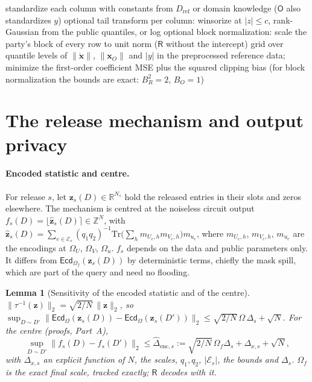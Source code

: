 \documentclass[11pt]{article}
\theoremstyle{definition}
\theoremstyle{plain}
\newtheorem{lemma}{Lemma}
\newcommand{\Rp}{\mathsf{R}}
\newcommand{\Op}{\mathsf{O}}
\newcommand{\Z}{\mathbb{Z}}
\newcommand{\Ecd}{\mathsf{Ecd}}
\newcommand{\bx}{\mathbf{x}}
\newcommand{\bxd}{\dot{\mathbf{x}}}
\begin{document}
\begin{algorithm}[h]
\begin{algorithmic}[1]
  \State standardize each column with constants from $D_{\mathrm{ref}}$ or domain knowledge ($\Op$ also standardizes $y$)
  \State optional tail transform per column: winsorize at $|z|\le c$, rank-Gaussian from the public quantiles, or log
  \State optional block normalization: scale the party's block of every row to unit norm ($\Rp$ without the intercept)
\EndFunction
{} grid over quantile levels of $\|\bxd\|$, $\|\bx_O\|$ and $|y|$ in the preprocessed reference data; minimize
\Statex \hspace{\algorithmicindent}the first-order coefficient MSE plus the squared clipping bias (for block normalization the bounds are exact: $B_R^2=2$, $B_O=1$)
\EndFunction
\end{algorithmic}
\end{algorithm}

\section{The release mechanism and output privacy}
\label{sec:privacy}

\paragraph{Encoded statistic and centre.} For release $s$, let $\mathbf z_s(D)\in\mathbb R^{N_s}$ hold the released entries in their slots and zeros elsewhere. The mechanism is centred at the noiseless circuit output $f_s(D)=\lfloor\hat{\mathbf z}_s(D)\rceil\in\Z^N$, with $\hat{\mathbf z}_s(D)=\sum_{e\in\mathcal E_s}(q_1q_2)^{-1}\mathrm{Tr}\bigl(\sum_hm_{U_e,h}m_{V_e,h}\bigr)m_{u_e}$, where $m_{U_e,h}$, $m_{V_e,h}$, $m_{u_e}$ are the encodings at $\Omega_U$, $\Omega_V$, $\Omega_u$. $f_s$ depends on the data and public parameters only. It differs from $\Ecd_{\Omega_f}(\mathbf z_s(D))$ by deterministic terms, chiefly the mask spill, which are part of the query and need no flooding.

\begin{lemma}[Sensitivity of the encoded statistic and of the centre]\label{lem:enc}
$\|\tau^{-1}(\mathbf z)\|_2=\sqrt{2/N}\,\|\mathbf z\|_2$, so $\sup_{D\sim D'}\|\Ecd_\Omega(\mathbf z_s(D))-\Ecd_\Omega(\mathbf z_s(D'))\|_2\le\sqrt{2/N}\,\Omega\,\Delta_s+\sqrt N$. For the centre (proofs, Part~A),
\[
  \sup_{D\sim D'}\|f_s(D)-f_s(D')\|_2\le\widehat\Delta_{\mathrm{enc},s}:=\sqrt{2/N}\,\Omega_f\Delta_s+\Delta_{x,s}+\sqrt N,
\]
with $\Delta_{x,s}$ an explicit function of $N$, the scales, $q_1,q_2$, $|\mathcal E_s|$, the bounds and $\Delta_s$. $\Omega_f$ is the exact final scale, tracked exactly; $\Rp$ decodes with it.
\end{lemma}
\end{document}
